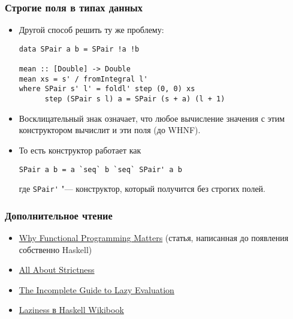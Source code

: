 \documentclass[11pt]{beamer}
\begin{document}
\begin{frame}[fragile]
\frametitle{Строгие поля в типах данных}
\begin{itemize}
    \item Другой способ решить ту же проблему:
\begin{lstlisting}[escapeinside=||,basicstyle=\ttfamily\footnotesize]
data SPair a b = SPair !a !b

mean :: [Double] -> Double
mean xs = s' / fromIntegral l'
where SPair s' l' = foldl' step (0, 0) xs
      step (SPair s l) a = SPair (s + a) (l + 1)
\end{lstlisting}
    \pause
    \item Восклицательный знак означает, что любое вычисление значения с этим конструктором вычислит и эти поля (до WHNF).
    \item То есть конструктор работает как
\begin{lstlisting}[escapeinside=||,basicstyle=\ttfamily\footnotesize]
SPair a b = a `seq` b `seq` SPair' a b
\end{lstlisting}
где \lstinline|SPair'| "--- конструктор, который получится без строгих полей.
\end{itemize}
\end{frame}

\begin{frame}[fragile]
\frametitle{Дополнительное чтение}
\begin{itemize}
    \item \href{https://blog.acolyer.org/2016/09/14/why-functional-programming-matters/}{Why Functional Programming Matters} (статья, написанная до появления собственно Haskell)
    \item \href{https://www.fpcomplete.com/blog/2017/09/all-about-strictness}{All About Strictness}
    \item \href{https://apfelmus.nfshost.com/articles/lazy-eval.html}{The Incomplete Guide to Lazy Evaluation}
    \item \href{https://en.wikibooks.org/wiki/Haskell/Laziness}{Laziness в Haskell Wikibook}
\end{itemize}
\end{frame}
\end{document}
